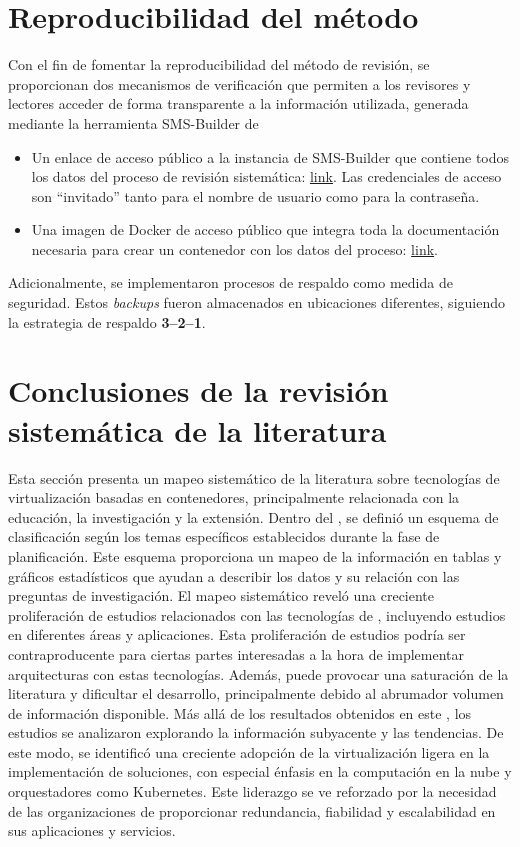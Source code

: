 \section{Reproducibilidad del método}
\noindent
Con el fin de fomentar la reproducibilidad del método de revisión, se proporcionan dos mecanismos de verificación que permiten a los revisores y lectores acceder de forma transparente a la información utilizada, generada mediante la herramienta SMS-Builder de~\cite{SMSBuilder2020}
\begin{itemize}
	\item Un enlace de acceso público a la instancia de SMS-Builder que contiene todos los datos del proceso de revisión sistemática: \href{https://github.com/grid-uq/sms-builder}{link}. Las credenciales de acceso son ``invitado'' tanto para el nombre de usuario como para la contraseña.
	\item Una imagen de Docker de acceso público que integra toda la documentación necesaria para crear un contenedor con los datos del proceso: \href{https://hub.docker.com/r/anubis1001/tg-vbc-sms-builder}{link}.
\end{itemize}

\noindent
Adicionalmente, se implementaron procesos de respaldo como medida de seguridad. Estos \textit{backups} fueron almacenados en ubicaciones diferentes, siguiendo la estrategia de respaldo \textbf{3--2--1}.

\section{Conclusiones de la revisión sistemática de la literatura}
\noindent
Esta sección presenta un mapeo sistemático de la literatura sobre tecnologías de virtualización basadas en contenedores, principalmente relacionada con la educación, la investigación y la extensión. Dentro del \SMS, se definió un esquema de clasificación según los temas específicos establecidos durante la fase de planificación. Este esquema proporciona un mapeo de la información en tablas y gráficos estadísticos que ayudan a describir los datos y su relación con las preguntas de investigación. El mapeo sistemático reveló una creciente proliferación de estudios relacionados con las tecnologías de \VBC, incluyendo estudios en diferentes áreas y aplicaciones. Esta proliferación de estudios podría ser contraproducente para ciertas partes interesadas a la hora de implementar arquitecturas con estas tecnologías. Además, puede provocar una saturación de la literatura y dificultar el desarrollo, principalmente debido al abrumador volumen de información disponible. Más allá de los resultados obtenidos en este \SMS, los estudios se analizaron explorando la información subyacente y las tendencias. De este modo, se identificó una creciente adopción de la virtualización ligera en la implementación de soluciones, con especial énfasis en la computación en la nube y orquestadores como Kubernetes. Este liderazgo se ve reforzado por la necesidad de las organizaciones de proporcionar redundancia, fiabilidad y escalabilidad en sus aplicaciones y servicios.
